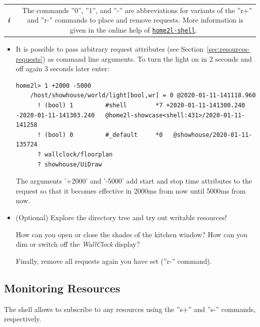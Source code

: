 \documentclass[12pt,english,parskip=half,headheight=19pt]{scrreprt}
\newcommand{\infobox}[1]{
  \par
  \medskip
  \hfill
  \setlength\arrayrulewidth{1pt}
  \begin{tabular}[t]{c|c|}
    \parbox{1.8em}{\hfill\textit{\Huge\textbf{i}\,}}
    &
    \,\parbox{0.89\linewidth}{\setlength{\parskip}{0.5em} \small #1}\,
  \end{tabular}
  \medskip
  \par
}
\newcommand{\idx}[1]{#1\index{#1}}
\newcommand{\reftool}[1]{\hyperref[tool:#1]{\texttt{\idx{#1}}}}
\begin{document}
\infobox{
  The commands ''0'', ''1'', and ''-'' are abbreviations for variants of the ''r+'' and ''r-''
  commands to place and remove requests. More information is given in the online help of \reftool{home2l-shell}.
}

\begin{itemize}[$\blacktriangleright$]

\item
  It is possible to pass arbitrary request attributes (see Section~\ref{sec:resources-requests})
  as command line arguments. To turn the light on in 2 seconds and off
  again 3 seconds later enter:
  \begin{lstlisting}[language=home2l]
    home2l> 1 +2000 -5000
    /host/showhouse/world/light[bool,wr] = 0 @2020-01-11-141118.960
      ! (bool) 1         #shell        *7 +2020-01-11-141300.240 -2020-01-11-141303.240   @home2l-showcase<shell:431>/2020-01-11-141258
      ! (bool) 0         #_default     *0   @showhouse/2020-01-11-135724
      ? wallclock/floorplan
      ? showhouse/UiDraw
  \end{lstlisting}
  The arguments '+2000' and '-5000' add start and stop time attributes to
  the request so that it becomes effective in 2000ms from now until 5000ms
  from now.

\item
  (Optional) Explore the directory tree and try out writable resources!

  How can you open or close the shades of the kitchen window?
  How can you dim or switch off the \textit{WallClock} display?

  Finally, remove all requests again you have set (''r-'' command).

\end{itemize}





\subsection{Monitoring Resources}
\label{sec:tutorial-shell-monitor}


The shell allows to subscribe to any resources using the ''s+'' and ''s-'' commands, respectively.
\end{document}
